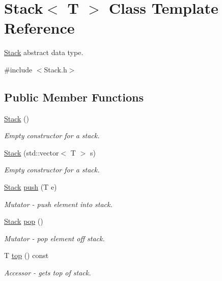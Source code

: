 \hypertarget{class_stack}{}\section{Stack$<$ T $>$ Class Template Reference}
\label{class_stack}


\hyperlink{class_stack}{Stack} abstract data type.  




{\ttfamily \#include $<$Stack.\+h$>$}

\subsection*{Public Member Functions}
\begin{DoxyCompactItemize}
\item 
\mbox{\label{class_stack_aefee698059467258bbd79045aca62a63}} 
\hyperlink{class_stack_aefee698059467258bbd79045aca62a63}{Stack} ()
\begin{DoxyCompactList}\small\item\em Empty constructor for a stack. \end{DoxyCompactList}\item 
\mbox{\label{class_stack_acf1a315995090bf9cf957ac84175c82c}} 
\hyperlink{class_stack_acf1a315995090bf9cf957ac84175c82c}{Stack} (std\+::vector$<$ T $>$ s)
\begin{DoxyCompactList}\small\item\em Empty constructor for a stack. \end{DoxyCompactList}\item 
\hyperlink{class_stack}{Stack} \hyperlink{class_stack_a4c6a61ccc7c974b889240299599be078}{push} (T e)
\begin{DoxyCompactList}\small\item\em Mutator -\/ push element into stack. \end{DoxyCompactList}\item 
\hyperlink{class_stack}{Stack} \hyperlink{class_stack_a0682e08ce3a10b12697dfd828a83268f}{pop} ()
\begin{DoxyCompactList}\small\item\em Mutator -\/ pop element off stack. \end{DoxyCompactList}\item 
T \hyperlink{class_stack_a1931814ad68db1eaedabdb37fa0fe494}{top} () const
\begin{DoxyCompactList}\small\item\em Accessor -\/ gets top of stack. \end{DoxyCompactList}\item 

\end{DoxyCompactItemize}
